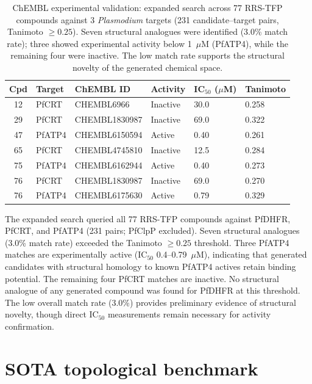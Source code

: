 \documentclass[11pt,a4paper]{article}
\begin{document}
\begin{table}[htbp]
\centering
\caption{ChEMBL experimental validation: expanded search across 77 RRS-TFP compounds against 3 \textit{Plasmodium} targets (231 candidate--target pairs, Tanimoto $\geq 0.25$). Seven structural analogues were identified (3.0\% match rate); three showed experimental activity below 1~$\mu$M (PfATP4), while the remaining four were inactive. The low match rate supports the structural novelty of the generated chemical space.}
\label{tab:chembl_validation}
\small
\begin{tabularx}{\textwidth}{c l l l l l}
\toprule
Cpd & Target & ChEMBL ID & Activity & {IC$_{50}$ ($\mu$M)} & Tanimoto \\
\midrule
12 & PfCRT & CHEMBL6966 & Inactive & 30.0 & 0.258 \\
29 & PfCRT & CHEMBL1830987 & Inactive & 69.0 & 0.322 \\
47 & PfATP4 & CHEMBL6150594 & Active & 0.40 & 0.261 \\
65 & PfCRT & CHEMBL4745810 & Inactive & 12.5 & 0.284 \\
75 & PfATP4 & CHEMBL6162944 & Active & 0.40 & 0.273 \\
76 & PfCRT & CHEMBL1830987 & Inactive & 69.0 & 0.270 \\
76 & PfATP4 & CHEMBL6175630 & Active & 0.79 & 0.329 \\
\bottomrule
\end{tabularx}
\vspace{1mm}
\footnotesize The expanded search queried all 77 RRS-TFP compounds against PfDHFR, PfCRT, and PfATP4 (231 pairs; PfClpP excluded). Seven structural analogues (3.0\% match rate) exceeded the Tanimoto $\geq 0.25$ threshold. Three PfATP4 matches are experimentally active (IC$_{50}$ 0.4--0.79~$\mu$M), indicating that generated candidates with structural homology to known PfATP4 actives retain binding potential. The remaining four PfCRT matches are inactive. No structural analogue of any generated compound was found for PfDHFR at this threshold. The low overall match rate (3.0\%) provides preliminary evidence of structural novelty, though direct IC$_{50}$ measurements remain necessary for activity confirmation.
\end{table}



\section{SOTA topological benchmark}
\label{SM-sec:sota_benchmark}
\end{document}
